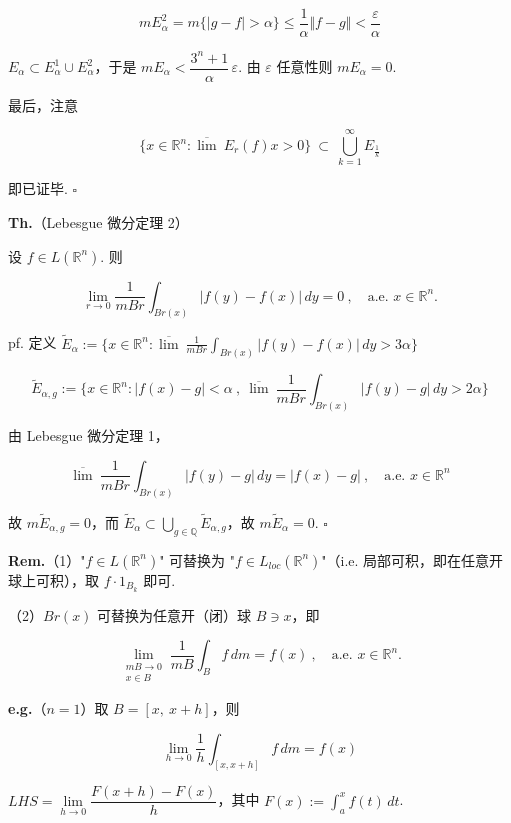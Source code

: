 \documentclass[11pt]{ctexart}
\theoremstyle{definition}
\begin{document}
\[
mE_\alpha^2 = m\{\vert g - f\vert > \alpha\} \leq \frac{1}{\alpha} \Vert f - g\Vert < \frac{\varepsilon}{\alpha}
\]

$E_\alpha \subset E_\alpha^1 \cup E_\alpha^2$，于是 $mE_\alpha < \dfrac{3^n + 1}{\alpha}\, \varepsilon$. 由 $\varepsilon$ 任意性则 $mE_\alpha = 0$.

最后，注意

\[
\{x \in \mathbb{R}^n : \overline{\lim}\ E_r(f)x > 0\} \ \subset\ \bigcup_{k=1}^{\infty} E_{\frac{1}{k}}
\]

即已证毕. $\square$

\textbf{Th.}（Lebesgue 微分定理 2）

设 $f \in L(\mathbb{R}^n)$. 则

\[
\lim_{r \to 0} \frac{1}{mBr} \int_{Br(x)} \vert f(y) - f(x)\vert \, dy = 0 \ ,\quad \text{a.e. } x \in \mathbb{R}^n.
\]

pf. 定义 $\widetilde{E}_\alpha := \Big\{ x \in \mathbb{R}^n : \overline{\lim}\ \frac{1}{mBr} \int_{Br(x)} \vert f(y) - f(x)\vert \, dy > 3\alpha \Big\}$

\[
\widetilde{E}_{\alpha, g} := \Big\{ x \in \mathbb{R}^n : \vert f(x) - g\vert < \alpha \ ,\ \overline{\lim}\ \frac{1}{mBr} \int_{Br(x)} \vert f(y) - g\vert \, dy > 2\alpha \Big\}
\]

由 Lebesgue 微分定理 1，

\[
\overline{\lim}\ \frac{1}{mBr} \int_{Br(x)} \vert f(y) - g\vert \, dy = \vert f(x) - g\vert \ ,\quad \text{a.e. } x \in \mathbb{R}^n
\]

故 $m\widetilde{E}_{\alpha, g} = 0$，而 $\widetilde{E}_\alpha \subset \bigcup\limits_{g \in \mathbb{Q}} \widetilde{E}_{\alpha, g}$，故 $m\widetilde{E}_\alpha = 0$. $\square$

\textbf{Rem.}（1）"$f \in L(\mathbb{R}^n)$" 可替换为 "$f \in L_{loc}(\mathbb{R}^n)$"（i.e. 局部可积，即在任意开球上可积），取 $f \cdot 1_{B_k}$ 即可.

（2）$Br(x)$ 可替换为任意开（闭）球 $B \ni x$，即

\[
\lim_{\substack{mB \to 0 \\ x \in B}} \frac{1}{mB} \int_B f \, dm = f(x) \ ,\quad \text{a.e. } x \in \mathbb{R}^n.
\]

\textbf{e.g.}（$n = 1$）取 $B = [x,\ x+h]$，则

\[
\lim_{h \to 0} \frac{1}{h} \int_{[x, x+h]} f \, dm = f(x)
\]

$LHS = \lim\limits_{h \to 0} \dfrac{F(x + h) - F(x)}{h}$，其中 $F(x) := \displaystyle\int_a^x f(t)\, dt$.
\end{document}
